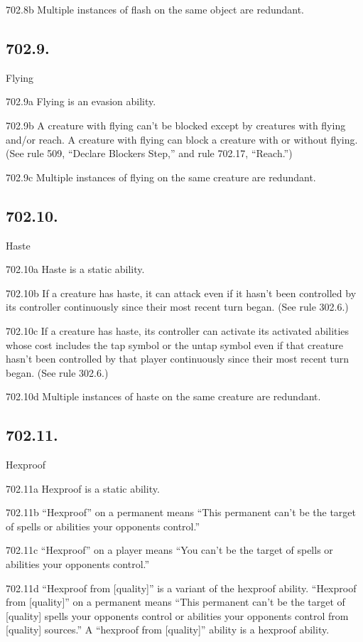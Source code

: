 702.8b Multiple instances of flash on the same object are redundant.

\subsection*{702.9.}
Flying

702.9a Flying is an evasion ability.

702.9b A creature with flying can’t be blocked except by creatures with flying and/or reach. A creature with flying can block a creature with or without flying. (See rule 509, “Declare Blockers Step,” and rule 702.17, “Reach.”)

702.9c Multiple instances of flying on the same creature are redundant.

\subsection*{702.10.}
Haste

702.10a Haste is a static ability.

702.10b If a creature has haste, it can attack even if it hasn’t been controlled by its controller continuously since their most recent turn began. (See rule 302.6.)

702.10c If a creature has haste, its controller can activate its activated abilities whose cost includes the tap symbol or the untap symbol even if that creature hasn’t been controlled by that player continuously since their most recent turn began. (See rule 302.6.)

702.10d Multiple instances of haste on the same creature are redundant.

\subsection*{702.11.}
Hexproof

702.11a Hexproof is a static ability.

702.11b “Hexproof” on a permanent means “This permanent can’t be the target of spells or abilities your opponents control.”

702.11c “Hexproof” on a player means “You can’t be the target of spells or abilities your opponents control.”

702.11d “Hexproof from [quality]” is a variant of the hexproof ability. “Hexproof from [quality]” on a permanent means “This permanent can’t be the target of [quality] spells your opponents control or abilities your opponents control from [quality] sources.” A “hexproof from [quality]” ability is a hexproof ability.

